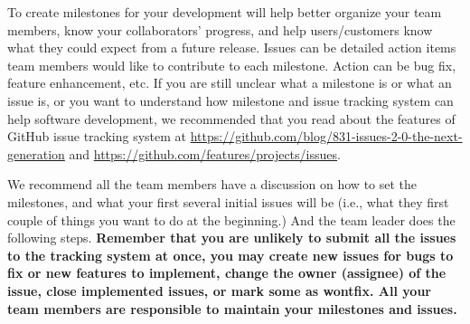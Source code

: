 To create milestones for your development will help better organize your team
members, know your collaborators' progress, and help users/customers know what
they could expect from a future release. Issues can be detailed action items
team members would like to contribute to each milestone. Action can be bug fix,
feature enhancement, etc. If you are still unclear what a milestone is or what
an issue is, or you want to understand how milestone and issue tracking system
can help software development, we recommended that you read about the features of GitHub
issue tracking system at
\url{https://github.com/blog/831-issues-2-0-the-next-generation} and
\url{https://github.com/features/projects/issues}.

We recommend all the team members have a discussion on how to set the
milestones, and what your first several initial issues will be (i.e., what they
first couple of things you want to do at the beginning.) And the team leader
does the following steps. \textbf{Remember that you are unlikely to submit all
the issues to the tracking system at once, you may create new issues for bugs to
fix or new features to implement, change the owner (assignee) of the issue,
close implemented issues, or mark some as wontfix. All your team members
are responsible to maintain your milestones and issues.}

